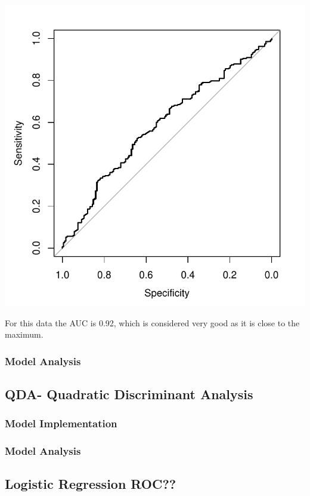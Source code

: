 \documentclass[]{report}
\begin{document}
\begin{center}
	\includegraphics{Figures/lda_roc.pdf}
\end{center}

For this data the AUC is 0.92, which is considered very good as it is close to the maximum.

\subsubsection{Model Analysis}


\subsection{QDA- Quadratic Discriminant Analysis}

\subsubsection{Model Implementation}

\subsubsection{Model Analysis}


\subsection{Logistic Regression  ROC??}
\end{document}
